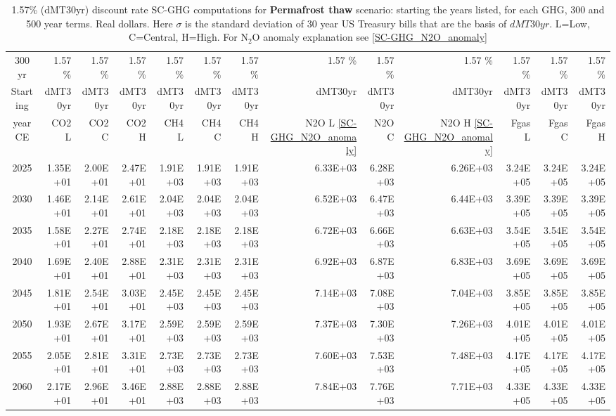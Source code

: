 \documentclass{article}
\begin{document}
\begin{table}
      \caption{1.57\% (dMT30yr) discount rate  SC-GHG computations for \textbf{Permafrost thaw} scenario: starting the years listed, for each GHG, 300 and 500 year terms. Real dollars. Here $\sigma$ is the standard deviation of 30 year US Treasury bills that are the basis of $dMT30yr$. L=Low, C=Central, H=High. For N$_2$O anomaly explanation see \ref{SC-GHG_N2O_anomaly}} 
\label{PVs_300_yearSCC_S1.57}
\small
\begin{tabular}{crrr|rrr|rrr|rrr}
300 yr   & 1.57 \%  & 1.57 \%  & 1.57 \%  & 1.57 \%  & 1.57 \%  & 1.57 \%  & 1.57 \%  & 1.57 \%  & 1.57 \%  & 1.57 \%  & 1.57 \%  & 1.57 \%  \\
Starting & dMT30yr  & dMT30yr  & dMT30yr  & dMT30yr  & dMT30yr  & dMT30yr  & dMT30yr  & dMT30yr  & dMT30yr  & dMT30yr  & dMT30yr  & dMT30yr  \\
year CE  & CO2 L    & CO2 C    & CO2 H    & CH4 L    & CH4 C    & CH4 H    & N2O L \ref{SC-GHG_N2O_anomaly}     & N2O C      & N2O H \ref{SC-GHG_N2O_anomaly}    & Fgas L   & Fgas C   & Fgas H   \\
2025     & 1.35E+01 & 2.00E+01 & 2.47E+01 & 1.91E+03 & 1.91E+03 & 1.91E+03 & 6.33E+03 & 6.28E+03 & 6.26E+03 & 3.24E+05 & 3.24E+05 & 3.24E+05 \\
2030     & 1.46E+01 & 2.14E+01 & 2.61E+01 & 2.04E+03 & 2.04E+03 & 2.04E+03 & 6.52E+03 & 6.47E+03 & 6.44E+03 & 3.39E+05 & 3.39E+05 & 3.39E+05 \\
2035     & 1.58E+01 & 2.27E+01 & 2.74E+01 & 2.18E+03 & 2.18E+03 & 2.18E+03 & 6.72E+03 & 6.66E+03 & 6.63E+03 & 3.54E+05 & 3.54E+05 & 3.54E+05 \\
2040     & 1.69E+01 & 2.40E+01 & 2.88E+01 & 2.31E+03 & 2.31E+03 & 2.31E+03 & 6.92E+03 & 6.87E+03 & 6.83E+03 & 3.69E+05 & 3.69E+05 & 3.69E+05 \\
2045     & 1.81E+01 & 2.54E+01 & 3.03E+01 & 2.45E+03 & 2.45E+03 & 2.45E+03 & 7.14E+03 & 7.08E+03 & 7.04E+03 & 3.85E+05 & 3.85E+05 & 3.85E+05 \\
2050     & 1.93E+01 & 2.67E+01 & 3.17E+01 & 2.59E+03 & 2.59E+03 & 2.59E+03 & 7.37E+03 & 7.30E+03 & 7.26E+03 & 4.01E+05 & 4.01E+05 & 4.01E+05 \\
2055     & 2.05E+01 & 2.81E+01 & 3.31E+01 & 2.73E+03 & 2.73E+03 & 2.73E+03 & 7.60E+03 & 7.53E+03 & 7.48E+03 & 4.17E+05 & 4.17E+05 & 4.17E+05 \\
2060     & 2.17E+01 & 2.96E+01 & 3.46E+01 & 2.88E+03 & 2.88E+03 & 2.88E+03 & 7.84E+03 & 7.76E+03 & 7.71E+03 & 4.33E+05 & 4.33E+05 & 4.33E+05 \\

\end{tabular}
\end{table}
\end{document}
